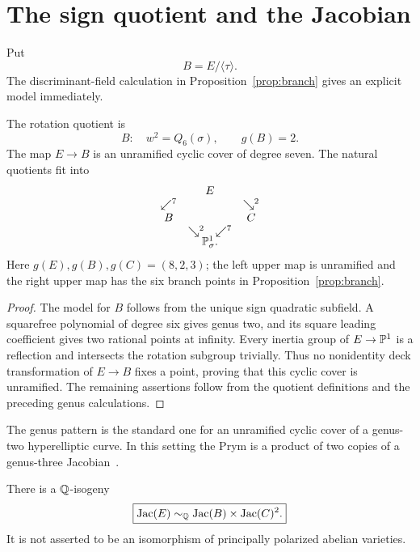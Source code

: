 \section{The sign quotient and the Jacobian}\label{sec:quotients}

Put
\[
 B=E/\langle\tau\rangle.
\]
The discriminant-field calculation in Proposition~\ref{prop:branch} gives an
explicit model immediately.

\begin{theorem}\label{thm:quotient}
The rotation quotient is
\[
 B:\quad w^2=Q_6(\sigma),\qquad g(B)=2.
\]
The map $E\to B$ is an unramified cyclic cover of degree seven.  The natural
quotients fit into
\[
\begin{array}{ccc}
&E&\\
\swarrow^{7}&&\searrow^{2}\\
B&&C\\
&\searrow^{2}\quad\swarrow^{7}&\\[-1mm]
&\mathbb P^1_\sigma.&
\end{array}
\]
Here $g(E),g(B),g(C)=(8,2,3)$; the left upper map is unramified and the right
upper map has the six branch points in Proposition~\ref{prop:branch}.
\end{theorem}

\begin{proof}
The model for $B$ follows from the unique sign quadratic subfield.  A
squarefree polynomial of degree six gives genus two, and its square leading
coefficient gives two rational points at infinity.  Every inertia group of
$E\to\mathbb P^1$ is a reflection and intersects the rotation subgroup trivially.
Thus no nonidentity deck transformation of $E\to B$ fixes a point, proving
that this cyclic cover is unramified.  The remaining assertions follow from
the quotient definitions and the preceding genus calculations.
\end{proof}

The genus pattern is the standard one for an unramified cyclic cover of a
genus-two hyperelliptic curve.  In this setting the Prym is a product of two
copies of a genus-three Jacobian~\cite{lange2016fibres}.

\begin{theorem}\label{thm:isogeny}
There is a $\mathbb Q$-isogeny
\begin{equation}\label{eq:isogeny}
 \boxed{\operatorname{Jac}(E)\sim_\mathbb Q\operatorname{Jac}(B)\times\operatorname{Jac}(C)^2.}
\end{equation}
It is not asserted to be an isomorphism of principally polarized abelian
varieties.
\end{theorem}

